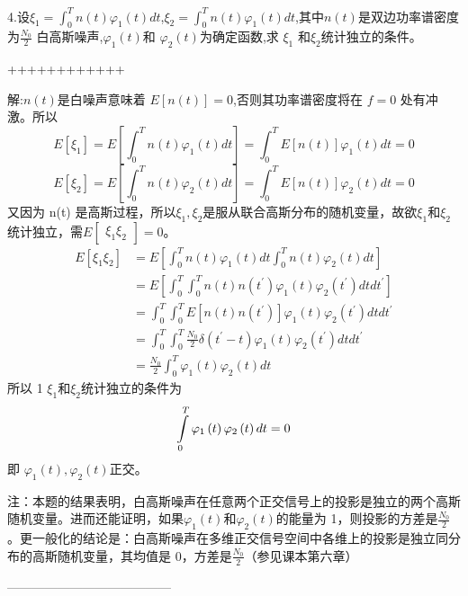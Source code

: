 \documentclass[utf8]{article}
\begin{document}
4.设$\xi_{1}=\int_{0}^{T}n\left(t\right)\varphi_{1}\left(t\right)dt $,$\xi_{2}=\int_{0}^{T}n\left(t\right)\varphi_{1}\left(t\right)dt $,其中$n\left(t\right)$是双边功率谱密度为$\frac{N_{0}}{2} $ 白高斯噪声,$\varphi_{1}\left(t\right)$和 $\varphi_{2}\left(t\right)$为确定函数,求 $\xi_{1}$ 和$\xi_{2}$统计独立的条件。

++++++++++++

解:$ n\left(t\right)$是白噪声意味着 $E{\left[n\left(t\right)\right]}=0$,否则其功率谱密度将在 $f=0$ 处有冲激。所以
$$E{\left[\xi_{1}\right]}=E{\left[\int_{0}^{T}n\left(t\right)\varphi_{1}\left(t\right)dt\right]}=\int_{0}^{T}E{\left[n\left(t\right)\right]}\varphi_{1}\left(t\right)dt=0$$
$$E\left[\xi_2\right]=E\left[\int_0^Tn\left(t\right)\varphi_2\left(t\right)dt\right]=\int_0^TE\left[n\left(t\right)\right]\varphi_2\left(t\right)dt=0$$
又因为 n(t) 是高斯过程，所以$\xi_1,\xi_2$是服从联合高斯分布的随机变量，故欲$\xi_1$和$\xi_2$统计独立，需$E\begin{bmatrix}\xi_1\xi_2\end{bmatrix}=0$。
$$\begin{aligned}E\left[\xi_1\xi_2\right]&=E\left[\int_0^Tn\left(t\right)\varphi_1\left(t\right)dt\int_0^Tn\left(t\right)\varphi_2\left(t\right)dt\right]\\&=E\left[\int_0^T\int_0^Tn\left(t\right)n\left(t^{\prime}\right)\varphi_1\left(t\right)\varphi_2\left(t^{\prime}\right)dtdt^{\prime}\right]\\&=\int_0^T\int_0^TE{\left[n\left(t\right)n\left(t^{\prime}\right)\right]}\varphi_1\left(t\right)\varphi_2\left(t^{\prime}\right)dtdt^{\prime}\\&=\int_0^T\int_0^T\frac{N_0}2\delta\left(t^{\prime}-t\right)\varphi_1\left(t\right)\varphi_2\left(t^{\prime}\right)dtdt^{\prime}\\&=\frac{N_0}2\int_0^T\varphi_1\left(t\right)\varphi_2\left(t\right)dt\end{aligned}$$
所以 1 $\xi_1$和$\xi_2$统计独立的条件为
$$\intop_0^T\varphi_1\left(t\right)\varphi_2\left(t\right)dt=0$$
即 $\varphi_1(t),\varphi_2(t)$正交。

注：本题的结果表明，白高斯噪声在任意两个正交信号上的投影是独立的两个高斯随机变量。进而还能证明，如果$\varphi_{1}\left(t\right)$和$\varphi_{2}\left(t\right)$的能量为 1，则投影的方差是$\frac{N_{0}}{2}$。更一般化的结论是：白高斯噪声在多维正交信号空间中各维上的投影是独立同分布的高斯随机变量，其均值是 0，方差是$\frac{N_{0}}{2}$（参见课本第六章）

---------------------------------------
\end{document}
